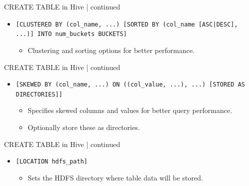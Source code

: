   \begin{frame}{CREATE TABLE in Hive | continued}
	\begin{tcolorbox}[colback=white,colframe=black,title= Part 6: Clustering and Sorting]
		\small
	\begin{itemize}
	  \item \texttt{[CLUSTERED BY (col\_name, ...) [SORTED BY (col\_name [ASC|DESC], ...)] INTO num\_buckets BUCKETS]}
	  \begin{itemize}
		\item Clustering and sorting options for better performance.
	  \end{itemize}
	\end{itemize}
	\end{tcolorbox}
  \end{frame}
  
  \begin{frame}{CREATE TABLE in Hive | continued}
	\begin{tcolorbox}[colback=white,colframe=black,title= Part 5: Data Skewing]
		\small
	\begin{itemize}
	  \item \texttt{[SKEWED BY (col\_name, ...) ON ((col\_value, ...), ...) [STORED AS DIRECTORIES]]}
	  \begin{itemize}
		\item Specifies skewed columns and values for better query performance.
		\item Optionally store these as directories.
	  \end{itemize}
	\end{itemize}
	\end{tcolorbox}
  \end{frame}
  

  
  \begin{frame}{CREATE TABLE in Hive | continued}
	\begin{tcolorbox}[colback=white,colframe=black,title= Part 8: Table Location]
		\small
	\begin{itemize}
	  \item \texttt{[LOCATION hdfs\_path]}
	  \begin{itemize}
		\item Sets the HDFS directory where table data will be stored.
	  \end{itemize}
	\end{itemize}
	\end{tcolorbox}	
  \end{frame}
  
